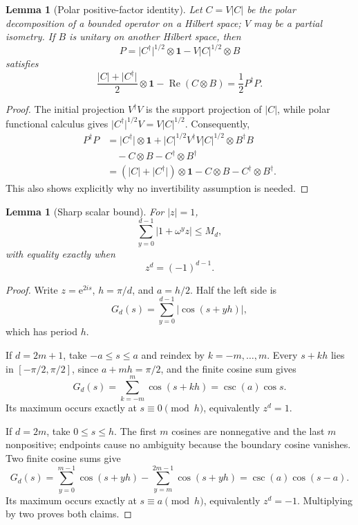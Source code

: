 \documentclass[11pt]{article}
\newtheorem{lemma}[theorem]{Lemma}
\theoremstyle{remark}
\newcommand{\Id}{\mathbf 1}
\newcommand{\Reop}{\operatorname{Re}}
\newcommand{\e}{\mathrm e}
\newcommand{\absop}[1]{\lvert #1\rvert}
\begin{document}
\begin{lemma}[Polar positive-factor identity]\label{lem:polar}
Let \(C=V\absop C\) be the polar decomposition of a bounded operator on a
Hilbert space; \(V\) may be a partial isometry.  If \(B\) is unitary on
another Hilbert space, then
\[
  P=\absop{C^\dagger}^{1/2}\otimes\Id
    -V\absop C^{1/2}\otimes B
\]
satisfies
\begin{equation}
  \frac{\absop C+\absop{C^\dagger}}2\otimes\Id
  -\Reop(C\otimes B)
  =\frac12P^\dagger P.
  \label{eq:polar}
\end{equation}
\end{lemma}

\begin{proof}
The initial projection \(V^\dagger V\) is the support projection of
\(\absop C\), while polar functional calculus gives
\(\absop{C^\dagger}^{1/2}V=V\absop C^{1/2}\).  Consequently,
\[
\begin{aligned}
 P^\dagger P
 &=
 \absop{C^\dagger}\otimes\Id+
 \absop C^{1/2}V^\dagger V\absop C^{1/2}\otimes B^\dagger B\\
 &\quad-C\otimes B-C^\dagger\otimes B^\dagger\\
 &=
 (\absop C+\absop{C^\dagger})\otimes\Id
 -C\otimes B-C^\dagger\otimes B^\dagger.
\end{aligned}
\]
This also shows explicitly why no invertibility assumption is needed.
\end{proof}

\begin{lemma}[Sharp scalar bound]\label{lem:scalar}
For \(\lvert z\rvert=1\),
\begin{equation}
  \sum_{y=0}^{d-1}\lvert1+\omega^yz\rvert\leq M_d,
  \label{eq:scalar}
\end{equation}
with equality exactly when
\begin{equation}
  z^d=(-1)^{d-1}.
  \label{eq:equality-roots}
\end{equation}
\end{lemma}

\begin{proof}
Write \(z=\e^{2is}\), \(h=\pi/d\), and \(a=h/2\).  Half the left side is
\[
  G_d(s)=\sum_{y=0}^{d-1}\lvert\cos(s+yh)\rvert,
\]
which has period \(h\).

If \(d=2m+1\), take \(-a\leq s\leq a\) and reindex by
\(k=-m,\ldots,m\).  Every \(s+kh\) lies in
\([-\pi/2,\pi/2]\), since \(a+mh=\pi/2\), and the finite cosine sum gives
\[
  G_d(s)=\sum_{k=-m}^{m}\cos(s+kh)=\csc(a)\cos s.
\]
Its maximum occurs exactly at \(s\equiv0\pmod h\), equivalently \(z^d=1\).

If \(d=2m\), take \(0\leq s\leq h\).  The first \(m\) cosines are
nonnegative and the last \(m\) nonpositive; endpoints cause no ambiguity
because the boundary cosine vanishes.  Two finite cosine sums give
\[
  G_d(s)
  =
  \sum_{y=0}^{m-1}\cos(s+yh)
  -\sum_{y=m}^{2m-1}\cos(s+yh)
  =\csc(a)\cos(s-a).
\]
Its maximum occurs exactly at \(s\equiv a\pmod h\), equivalently \(z^d=-1\).
Multiplying by two proves both claims.
\end{proof}
\end{document}
